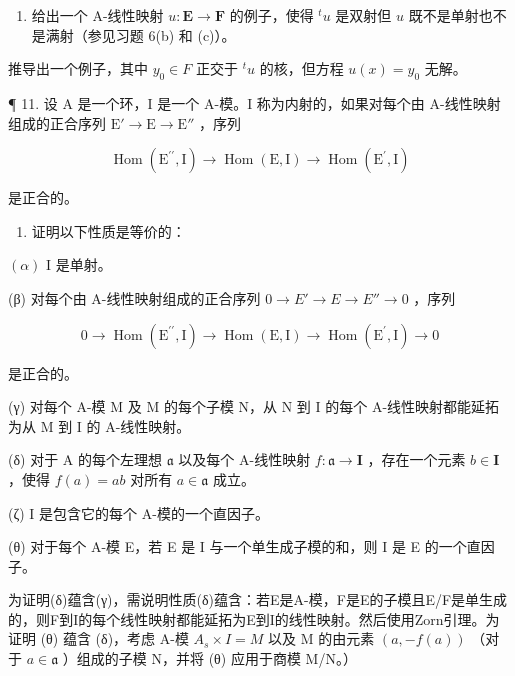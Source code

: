 \begin{enumerate}
\def\labelenumi{\arabic{enumi}.}
\setcounter{enumi}{9}
\tightlist
\item
  给出一个 A-线性映射 \(u: \mathbf{E} \to \mathbf{F}\) 的例子，使得 \(^t u\) 是双射但 \(u\) 既不是单射也不是满射（参见习题 6(b) 和 (c)）。
\end{enumerate}

推导出一个例子，其中 \(y_{0} \in F\) 正交于 \(^{t}u\) 的核，但方程 \(u(x) = y_{0}\) 无解。

¶ 11. 设 A 是一个环，I 是一个 A-模。I 称为内射的，如果对每个由 A-线性映射组成的正合序列 \(\mathrm{E}' \to \mathrm{E} \to \mathrm{E}''\) ，序列

\[
\operatorname{Hom} \left(\mathrm{E} ^ {\prime \prime}, \mathrm{I}\right)\rightarrow \operatorname{Hom} (\mathrm{E}, \mathrm{I}) \rightarrow \operatorname{Hom} \left(\mathrm{E} ^ {\prime}, \mathrm{I}\right)
\]

是正合的。

\begin{enumerate}
\def\labelenumi{(\alph{enumi})}
\tightlist
\item
  证明以下性质是等价的：
\end{enumerate}

\((\alpha)\) I 是单射。

(β) 对每个由 A-线性映射组成的正合序列 \(0 \rightarrow E' \rightarrow E \rightarrow E'' \rightarrow 0\) ，序列

\[
0 \rightarrow \operatorname{Hom} (\mathrm{E} ^ {\prime \prime}, \mathrm{I}) \rightarrow \operatorname{Hom} (\mathrm{E}, \mathrm{I}) \rightarrow \operatorname{Hom} (\mathrm{E} ^ {\prime}, \mathrm{I}) \rightarrow 0
\]

是正合的。

(γ) 对每个 A-模 M 及 M 的每个子模 N，从 N 到 I 的每个 A-线性映射都能延拓为从 M 到 I 的 A-线性映射。

(δ) 对于 A 的每个左理想 \(\mathfrak{a}\) 以及每个 A-线性映射 \(f: \mathfrak{a} \to \mathbf{I}\) ，存在一个元素 \(b \in \mathbf{I}\) ，使得 \(f(a) = ab\) 对所有 \(a \in \mathfrak{a}\) 成立。

(ζ) I 是包含它的每个 A-模的一个直因子。

(θ) 对于每个 A-模 E，若 E 是 I 与一个单生成子模的和，则 I 是 E 的一个直因子。

为证明(δ)蕴含(γ)，需说明性质(δ)蕴含：若E是A-模，F是E的子模且E/F是单生成的，则F到I的每个线性映射都能延拓为E到I的线性映射。然后使用Zorn引理。为证明 (θ) 蕴含 (δ)，考虑 A-模 \(A_{s} \times I = M\) 以及 M 的由元素 \((a, -f(a))\) （对于 \(a \in \mathfrak{a}\) ）组成的子模 N，并将 (θ) 应用于商模 M/N。）

